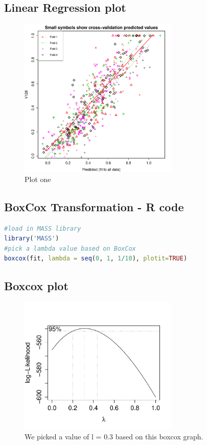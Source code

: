 \documentclass{article}
\begin{document}
\subsection{Linear Regression plot}
\begin{figure}[H]
\centering
\includegraphics[width=3.0in]{part1a.pdf}
\caption{Plot one}\label{fig_container} 
\end{figure}

\subsection{BoxCox Transformation - R code}
\begin{lstlisting}[language=r]
#load in MASS library
library('MASS')
#pick a lambda value based on BoxCox
boxcox(fit, lambda = seq(0, 1, 1/10), plotit=TRUE)
\end{lstlisting}

\subsection{Boxcox plot}
\begin{figure}[H]
\centering
\includegraphics[width=3.0in]{boxcox.pdf}
\caption{We picked a value of l = 0.3 based on this boxcox graph. }\label{fig_container} 
\end{figure}
\end{document}

